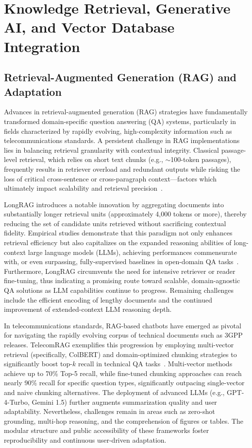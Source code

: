 \documentclass[sigconf]{acmart}
\begin{document}
\section{Knowledge Retrieval, Generative AI, and Vector Database Integration}

\subsection{Retrieval-Augmented Generation (RAG) and Adaptation}

Advances in retrieval-augmented generation (RAG) strategies have fundamentally transformed domain-specific question answering (QA) systems, particularly in fields characterized by rapidly evolving, high-complexity information such as telecommunications standards. A persistent challenge in RAG implementations lies in balancing retrieval granularity with contextual integrity. Classical passage-level retrieval, which relies on short text chunks (e.g., \(\sim\)100-token passages), frequently results in retriever overload and redundant outputs while risking the loss of critical cross-sentence or cross-paragraph context---factors which ultimately impact scalability and retrieval precision~\cite{ref34}.

LongRAG introduces a notable innovation by aggregating documents into substantially longer retrieval units (approximately 4,000 tokens or more), thereby reducing the set of candidate units retrieved without sacrificing contextual fidelity. Empirical studies demonstrate that this paradigm not only enhances retrieval efficiency but also capitalizes on the expanded reasoning abilities of long-context large language models (LLMs), achieving performances commensurate with, or even surpassing, fully-supervised baselines in open-domain QA tasks~\cite{ref34}. Furthermore, LongRAG circumvents the need for intensive retriever or reader fine-tuning, thus indicating a promising route toward scalable, domain-agnostic QA solutions as LLM capabilities continue to progress. Remaining challenges include the efficient encoding of lengthy documents and the continued improvement of extended-context LLM reasoning depth.

In telecommunications standards, RAG-based chatbots have emerged as pivotal for navigating the rapidly evolving corpus of technical documents such as 3GPP releases. TelecomRAG exemplifies this progression by employing multi-vector retrieval (specifically, ColBERT) and domain-optimized chunking strategies to significantly boost top-\(k\) recall in technical QA tasks~\cite{ref20}. Multi-vector methods achieve up to 70\% Top-5 recall, while fine-tuned chunking approaches can reach nearly 90\% recall for specific question types, significantly outpacing single-vector and naive chunking alternatives. The deployment of advanced LLMs (e.g., GPT-4-Turbo, Gemini 1.5) further augments summarization quality and user adaptability. Nevertheless, challenges remain in areas such as zero-shot grounding, multi-hop reasoning, and the comprehension of figures or tables. The modular structure and public accessibility of these frameworks foster reproducibility and continuous user-driven adaptation.
\end{document}
